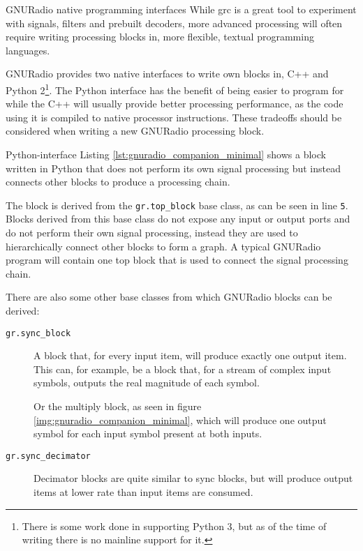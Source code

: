 \begin{subchapter}{GNURadio native programming interfaces}
  While \gls{grc} is a great tool to experiment with signals,
  filters and prebuilt decoders, more advanced processing will
  often require writing processing blocks in, more flexible,
  textual programming languages.

  GNURadio provides two native interfaces to write own
  blocks in, C++ and Python 2\footnote{There is some work done
  in supporting Python 3, but as of the time of writing there is no
  mainline support for it.}.
  The Python interface has the benefit of being easier to program
  for while the C++ will usually provide better processing performance,
  as the code using it is compiled to native processor instructions.
  These tradeoffs should be considered when writing a
  new GNURadio processing block.

  \begin{subsubchapter}{Python-interface}
    Listing \ref{lst:gnuradio_companion_minimal} shows a block written
    in Python that does not perform its own signal processing but
    instead connects other blocks to produce a processing chain.

    The block is derived from the \texttt{gr.top\_block} base class,
    as can be seen in line \texttt{5}. Blocks derived from this base class
    do not expose any input or output ports and do not perform their own
    signal processing, instead they are used to hierarchically connect
    other blocks to form a graph.
    A typical GNURadio program will contain one top block that is
    used to connect the signal processing chain.

    There are also some other base classes from which GNURadio
    blocks can be derived\cite{grblockscodingguide}:

    \begin{description}
      \item[\texttt{gr.sync\_block}]
        A block that, for every input item, will produce exactly
        one output item. This can, for example, be a block that,
        for a stream of complex input symbols, outputs the real
        magnitude of each symbol.

        Or the multiply block, as seen in figure
        \ref{img:gnuradio_companion_minimal}, which will produce one
        output symbol for each input symbol present at both inputs.

      \item[\texttt{gr.sync\_decimator}]
        Decimator blocks are quite similar to sync blocks,
        but will produce output items at lower rate than input items
        are consumed.


\end{description}
\end{subsubchapter}
\end{subchapter}
